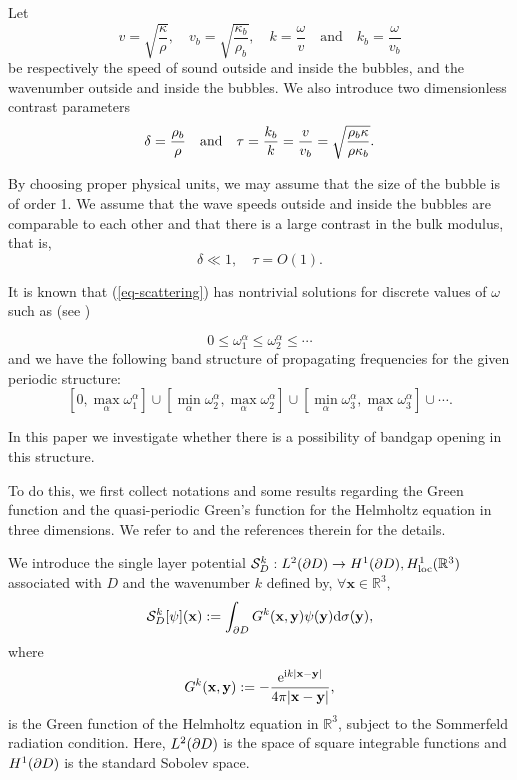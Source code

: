 \documentclass[11pt]{article}
\numberwithin{equation}{section}
\def\bx{{\mathbf{x}}}
\def\by{{\mathbf{y}}}
\def\rd{{\mathrm{d}}}
\def\re{{\mathrm{e}}}
\def\ri{{\mathrm{i}}}
\def\loc{{\mathrm{loc}}}
\newcommand\1{{\ensuremath {\mathds 1} }}
\newcommand{\R}{\mathbb{R}}
\newcommand{\eqnref}[1]{(\ref {#1})}
\begin{document}
Let
\begin{equation*} %
v = \sqrt{\frac{\kappa}{\rho}}, \quad v_b = \sqrt{\frac{\kappa_b}{\rho_b}}, \quad k= \frac{\omega}{v} \quad \text{and} \quad k_b= \frac{\omega}{v_b}
\end{equation*}
be respectively the speed of sound outside and inside the bubbles, and the wavenumber outside and inside the bubbles. We also introduce two dimensionless contrast parameters
\begin{equation*} %
\delta = \f{\rho_b}{\rho} \quad \text{and} \quad \tau= \f{k_b}{k}= \f{v}{v_b} =\sqrt{\f{\rho_b \kappa}{\rho \kappa_b}}. 
\end{equation*}

By choosing proper physical units, we may assume that the size of the bubble is of order 1.  We assume  that the wave speeds outside and inside the bubbles are comparable to each other and that there is a large contrast in the bulk modulus, that is, $$\delta \ll 1,\quad \tau= O(1).$$

It is known that \eqnref{eq-scattering} has nontrivial solutions for discrete values of $\omega$ such as (see \cite{Ammari2009_book})

$$  0 \le \omega_1^\alpha \le \omega_2^\alpha \le \cdots$$
and we have the following band structure of propagating frequencies for the given periodic structure:
$$ [0, \max_\alpha \omega_1^\alpha] \cup [ \min_\alpha \omega_2^\alpha, \max_\alpha \omega_2^\alpha] \cup  [ \min_\alpha \omega_3^\alpha, \max_\alpha \omega_3^\alpha] \cup \cdots. $$


In this paper we investigate whether there is a possibility of  bandgap opening in this structure. 

To do this, we first collect notations and some results regarding  the Green function and the quasi-periodic Green's function for the Helmholtz equation in three dimensions. We refer to \cite{Ammari2009_book} and the references therein for the details.


We  introduce the single layer potential $\mathcal{S}_{D}^{k} : L^2(\p D) \to H^1(\p D), H^1_\loc (\R^3)$ associated with $D$ and the wavenumber $k$  defined by, $\forall \bx \in \R^3,$
$$
	  \mathcal{S}_{D}^{k} [\psi](\bx) :=  \int_{\p D} G^k(\bx, \by) \psi(\by) \rd \sigma(\by),
$$
where $$G^k(\bx, \by) :=  - \f{\re^{\ri k |\bx-\by|}}{4 \pi |\bx-\by|},$$ is the Green function of the Helmholtz equation in $\R^3$, subject to the Sommerfeld radiation condition. Here, $L^2(\partial D)$ is the space of square integrable functions and $H^1(\partial D)$ is the standard Sobolev space. 
\end{document}
